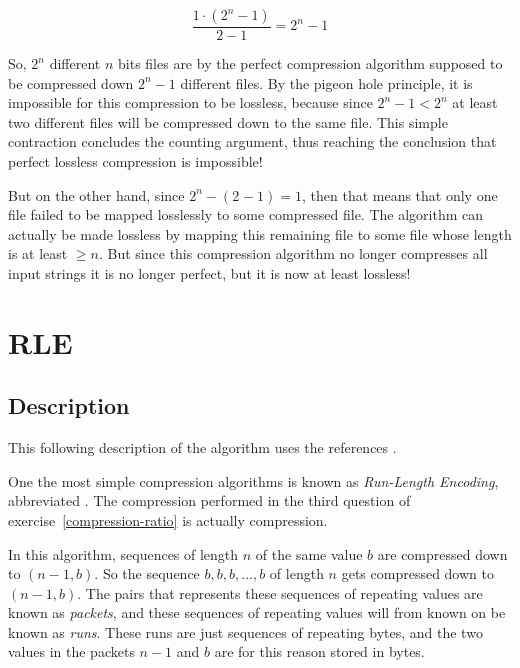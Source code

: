 \begin{equation*}
  \frac{1 \cdot (2^{n} - 1)}{2 -1} = 2^{n} - 1
\end{equation*}

So, $2^n$ different $n$ bits files are by the perfect compression
algorithm supposed to be compressed down $2^n - 1$ different files. By
the pigeon hole principle, it is impossible for this compression to be
lossless, because since $2^n - 1 < 2^n$ at least two different files
will be compressed down to the same file. This simple contraction
concludes the counting argument, thus reaching the conclusion that
perfect lossless compression is impossible!

But on the other hand, since $2^n - (2^{} - 1) = 1$, then that means
that only one file failed to be mapped losslessly to some compressed
file. The algorithm can actually be made lossless by mapping this
remaining file to some file whose length is at least $\ge n$. But
since this compression algorithm no longer compresses all input
strings it is no longer perfect, but it is now at least lossless!

\section{RLE}
\label{sec:rle}

\subsection{Description}

This following description of the \rle algorithm uses the references
\cite{nagarajan11:_enhan_approac_run_lengt_encod_schem,murray1996encyclopedia,mark1996data_compression_book}.

One the most simple compression algorithms is known as
\textit{Run-Length Encoding}, abbreviated \rle. The compression
performed in the third question of exercise~\ref{compression-ratio} is
actually \rle compression.

In this algorithm, sequences of length $n$ of the same value $b$ are
compressed down to $(n-1,b)$. So the sequence $b,b,b,...,b$ of length
$n$ gets compressed down to $(n-1,b)$. The pairs that represents these
sequences of repeating values are known as \textit{packets}, and these
sequences of repeating values will from known on be known as
\textit{runs}. These runs are just sequences of repeating bytes, and
the two values in the packets $n-1$ and $b$ are for this reason stored
in bytes.


